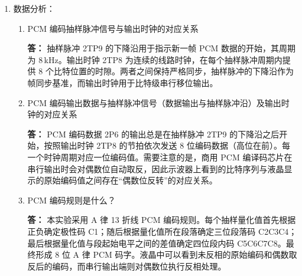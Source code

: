 \documentclass{xjtureport}
\begin{document}
\begin{enumerate}[label=\roman*.]
			在示波器上选取某一抽样点，可以读出编码输出 2P6 的 8 bit 串行比特序列。例如，对应液晶界面量化值为 960 的样点，其液晶显示的 PCM 原始编码为 \texttt{11101110}。根据 TP3057 的输出特性，实际串行输出的数据其偶数位会自动取反，因此示波器上观测到的编码比特序列为 \texttt{10111011}。两者之间满足“偶数位取反”的关系，说明软件编码与硬件串行接口输出保持一致，编码器工作正常。
			
			\vspace{3em}
			
		\item 数据分析：
		
			\begin{enumerate}[label=\alph*)]
				
				\item PCM 编码抽样脉冲信号与输出时钟的对应关系
				
				\textbf{答：}
				抽样脉冲 2TP9 的下降沿用于指示新一帧 PCM 数据的开始，其周期为 8\,kHz。输出时钟 2TP8 为连续的线路时钟，在每个抽样脉冲周期内提供 8 个比特位置的时隙。两者之间保持严格同步，抽样脉冲的下降沿作为帧同步基准，而输出时钟用于比特级串行移位输出。
				
				\vspace{3em}
				
				\item PCM 编码输出数据与抽样脉冲信号（数据输出与抽样脉冲沿）及输出时钟的对应关系
				
				\textbf{答：}
				PCM 编码数据 2P6 的输出总是在抽样脉冲 2TP9 的下降沿之后开始，按照输出时钟 2TP8 的节拍依次发送 8 位编码数据（高位在前）。每一个时钟周期对应一位编码值。需要注意的是，商用 PCM 编译码芯片在串行输出时会对偶数位自动取反，因此示波器上看到的比特序列与液晶显示的原始编码值之间存在“偶数位反转”的对应关系。
				
				\vspace{3em}
				
				\item PCM 编码规则是什么？
				
				\textbf{答：}
				本实验采用 A 律 13 折线 PCM 编码规则。每个抽样量化值首先根据正负确定极性码 C1；随后根据量化值所在段落确定三位段落码 C2C3C4；最后根据量化值与段起始电平之间的差值确定四位段内码 C5C6C7C8。最终形成 8 位 A 律 PCM 码字。液晶中可以看到未反相的原始编码和偶数取反后的编码，而串行输出端则对偶数位执行反相处理。
				
				\vspace{3em}
			\end{enumerate}
			
		\end{enumerate}
		
\end{document}
